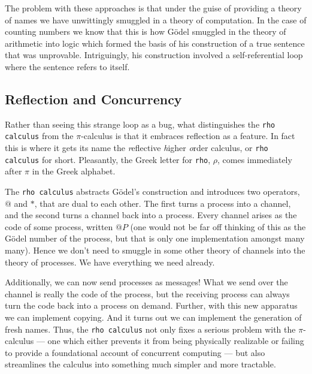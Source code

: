 \documentclass{article}
\newcommand{\code}[1]{\texttt{#1}}
\begin{document}
\medskip

The problem with these approaches is that under the guise of providing a theory of names we have unwittingly smuggled in a theory of computation. In the case of counting numbers we know that this is how Gödel smuggled in the theory of arithmetic into logic which formed the basis of his construction of a true sentence that was unprovable. Intriguingly, his construction involved a self-referential loop where the sentence refers to itself.

\subsection{Reflection and Concurrency}

Rather than seeing this strange loop as a bug, what distinguishes the \code{rho calculus} from the $\pi$-calculus is that it embraces reflection as a feature. In fact this is where it gets its name the \emph{r}eflective \emph{h}igher \emph{o}rder calculus, or \code{rho calculus} for short. Pleasantly, the Greek letter for \code{rho}, $\rho$, comes immediately after $\pi$ in the Greek alphabet.

\medskip

The \code{rho calculus} abstracts Gödel's construction and introduces two operators, $@$ and $*$, that are dual to each other. The first turns a process into a channel, and the second turns a channel back into a process. Every channel arises as the code of some process, written $@P$ (one would not be far off thinking of this as the Gödel number of the process, but that is only one implementation amongst many many). Hence we don't need to smuggle in some other theory of channels into the theory of processes. We have everything we need already.

\medskip

Additionally, we can now send processes as messages! What we send over the channel is really the code of the process, but the receiving process can always turn the code back into a process on demand. Further, with this new apparatus we can implement copying. And it turns out we can implement the generation of fresh names. Thus, the \code{rho calculus} not only fixes a serious problem with the $\pi$-calculus — one which either prevents it from being physically realizable or failing to provide a foundational account of concurrent computing — but also streamlines the calculus into something much simpler and more tractable.

\medskip
\end{document}

